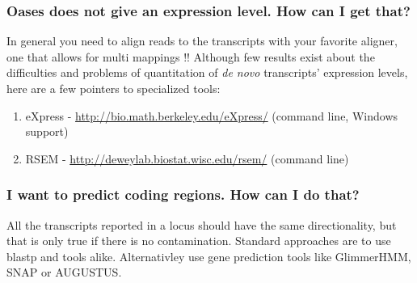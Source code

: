 \documentclass[12pt]{article}
\begin{document}
\subsubsection*{Oases does not give an expression level. How can I get that?}
In general you need to align reads to the transcripts with your favorite aligner, one that allows for multi mappings !! Although few results exist about the difficulties and problems of quantitation of \emph{de novo} transcripts' expression levels, here are a few pointers to specialized tools:
\begin{enumerate}
\item  eXpress - \url{http://bio.math.berkeley.edu/eXpress/} (command line, Windows support)
\item RSEM - \url{http://deweylab.biostat.wisc.edu/rsem/} (command line)

\end{enumerate}

\subsubsection*{I want to predict coding regions. How can I do that?}
All the transcripts reported in a locus should have the same directionality, but that is only true if there is no contamination. Standard approaches are to use blastp and tools alike.
Alternativley use gene prediction tools like GlimmerHMM, SNAP or AUGUSTUS.
\end{document}
